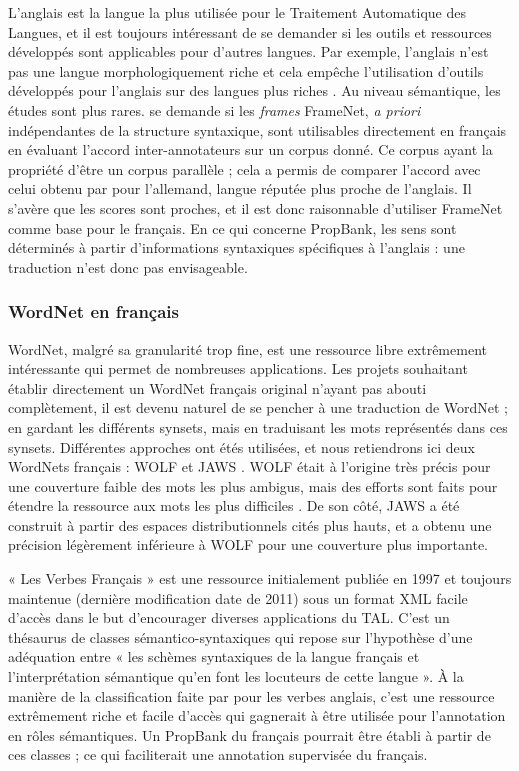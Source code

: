 L'anglais est la langue la plus utilisée pour le Traitement Automatique des Langues, et il est toujours intéressant de se demander si les outils et ressources développés sont applicables pour d'autres langues. Par exemple, l'anglais n'est pas une langue morphologiquement riche et cela empêche l'utilisation d'outils développés pour l'anglais sur des langues plus riches \citep{tsarfaty2010statistical}. Au niveau sémantique, les études sont plus rares. \cite{pado2007annotation} se demande si les \textit{frames} FrameNet, \textit{a priori} indépendantes de la structure syntaxique, sont utilisables directement en français en évaluant l'accord inter-annotateurs sur un corpus donné. Ce corpus ayant la propriété d'être un corpus parallèle ; cela a permis de comparer l'accord avec celui obtenu par \cite{pado2006optimal} pour l'allemand, langue réputée plus proche de l'anglais. Il s'avère que les scores sont proches, et il est donc raisonnable d'utiliser FrameNet comme base pour le français. En ce qui concerne PropBank, les sens sont déterminés à partir d'informations syntaxiques spécifiques à l'anglais : une traduction n'est donc pas envisageable.

\subsubsection{WordNet en français}

WordNet, malgré sa granularité trop fine, est une ressource libre extrêmement intéressante qui permet de nombreuses applications. Les projets souhaitant établir directement un WordNet français original n'ayant pas abouti complètement, il est devenu naturel de se pencher à une traduction de WordNet ; en gardant les différents synsets, mais en traduisant les mots représentés dans ces synsets. Différentes approches ont étés utilisées, et nous retiendrons ici deux WordNets français : WOLF \cite{sagot2008construction} et JAWS \cite{mouton2010jaws}. WOLF était à l'origine très précis pour une couverture faible des mots les plus ambigus, mais des efforts sont faits pour étendre la ressource aux mots les plus difficiles \citep{sagot2012automatic}. De son côté, JAWS a été construit à partir des espaces distributionnels cités plus hauts, et a obtenu une précision légèrement inférieure à WOLF pour une couverture plus importante.

« Les Verbes Français » est une ressource initialement publiée en 1997 et toujours maintenue (dernière modification date de 2011) sous un format XML facile d'accès dans le but d'encourager diverses applications du TAL. C'est un thésaurus de classes sémantico-syntaxiques qui repose sur l'hypothèse d'une adéquation entre « les schèmes syntaxiques de la langue français et l'interprétation sémantique qu'en font les locuteurs de cette langue ». À la manière de la classification faite par \cite{levin1993english} pour les verbes anglais, c'est une ressource extrêmement riche et facile d'accès qui gagnerait à être utilisée pour l'annotation en rôles sémantiques. Un PropBank du français pourrait être établi à partir de ces classes ; ce qui faciliterait une annotation supervisée du français.

